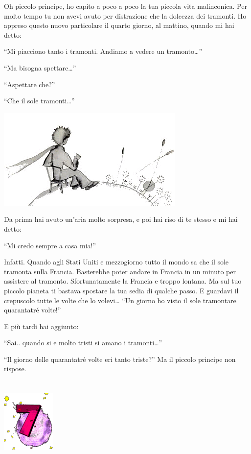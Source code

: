 \documentclass[11pt]{scrbook}
\begin{document}
Oh piccolo principe, ho capito a poco a poco la tua piccola vita
malinconica. Per molto tempo tu non avevi avuto per distrazione che la
dolcezza dei tramonti. Ho appreso questo nuovo particolare il quarto
giorno, al mattino, quando mi hai detto:

``Mi piacciono tanto i tramonti. Andiamo a vedere un tramonto\ldots{}''

``Ma bisogna spettare\ldots{}''

``Aspettare che?''

``Che il sole tramonti\ldots{}''

\begin{center}
\includegraphics{./img/6a.png}
\end{center}

Da prima hai avuto un'aria molto sorpresa, e poi hai riso di te stesso e
mi hai detto:

``Mi credo sempre a casa mia!''

Infatti. Quando agli Stati Uniti e mezzogiorno tutto il mondo sa che il
sole tramonta sulla Francia. Basterebbe poter andare in Francia in un
minuto per assistere al tramonto. Sfortunatamente la Francia e troppo
lontana. Ma sul tuo piccolo pianeta ti bastava spostare la tua sedia di
qualche passo. E guardavi il crepuscolo tutte le volte che lo
volevi\ldots{} ``Un giorno ho visto il sole tramontare quarantatré
volte!''

E più tardi hai aggiunto:

``Sai.. quando si e molto tristi si amano i tramonti\ldots{}''

``Il giorno delle quarantatré volte eri tanto triste?'' Ma il piccolo
principe non rispose.

\chapter{}
\begin{center}
\includegraphics{./img/chapter7.png}
\end{center}
\end{document}
